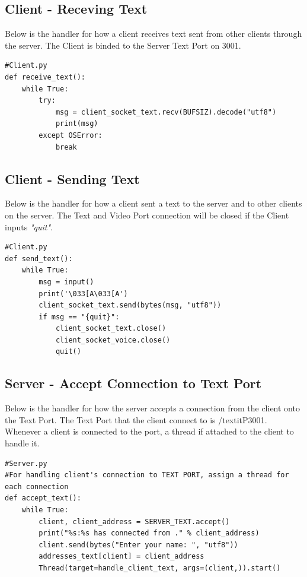 \documentclass[a4paper,11pt]{article}
\begin{document}
\subsection{Client - Receving Text }
Below is the handler for how a client receives text sent from other clients through the server. The Client is binded to the Server Text Port on 3001.
\begin{mdframed}[backgroundcolor=light-gray, roundcorner=30pt,leftmargin=1, rightmargin=1, innerleftmargin=5, innertopmargin=-3,innerbottommargin=5, outerlinewidth=1, linecolor=light-gray]
\begin{lstlisting}
#Client.py
def receive_text():
	while True:
		try:
			msg = client_socket_text.recv(BUFSIZ).decode("utf8")
			print(msg)
		except OSError:
			break
\end{lstlisting}
\end{mdframed}

\subsection{Client - Sending Text}
Below is the handler for how a client sent a text to the server and to other clients on the server. The Text and Video Port connection will be closed if the Client inputs \textit{"quit"}.
\begin{mdframed}[backgroundcolor=light-gray, roundcorner=30pt,leftmargin=1, rightmargin=1, innerleftmargin=5, innertopmargin=-3,innerbottommargin=5, outerlinewidth=1, linecolor=light-gray]
\begin{lstlisting}
#Client.py
def send_text():
	while True:
		msg = input()
		print('\033[A\033[A')
		client_socket_text.send(bytes(msg, "utf8"))
		if msg == "{quit}":
			client_socket_text.close()
			client_socket_voice.close()
			quit()
\end{lstlisting}
\end{mdframed}

\subsection{Server - Accept Connection to Text Port}
Below is the handler for how the server accepts a connection from the client onto the Text Port. The Text Port that the client connect to is /textit{P3001}. Whenever a client is connected to the port, a thread if attached to the client to handle it.
\begin{mdframed}[backgroundcolor=light-gray, roundcorner=30pt,leftmargin=1, rightmargin=1, innerleftmargin=5, innertopmargin=-3,innerbottommargin=5, outerlinewidth=1, linecolor=light-gray]
\begin{lstlisting}
#Server.py
#For handling client's connection to TEXT PORT, assign a thread for each connection
def accept_text():
	while True:
		client, client_address = SERVER_TEXT.accept()
		print("%s:%s has connected from ." % client_address)
		client.send(bytes("Enter your name: ", "utf8"))
		addresses_text[client] = client_address
		Thread(target=handle_client_text, args=(client,)).start()

\end{lstlisting}
\end{mdframed}
\end{document}
